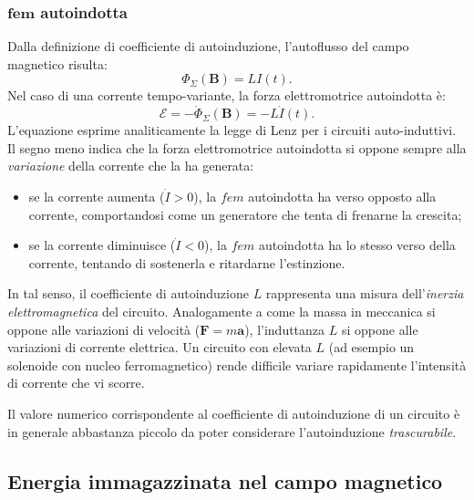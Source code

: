 \documentclass[a4paper,11pt]{report}
\begin{document}
\subsubsection{$\bm{fem}$ autoindotta}
Dalla definizione di coefficiente di autoinduzione, l'autoflusso del campo magnetico risulta:
\begin{equation}
\Phi_\Sigma(\bm{B}) = LI(t).
\end{equation}
Nel caso di una corrente tempo-variante, la forza elettromotrice autoindotta è:
\begin{equation}
\mathcal{E} = -\dot{\Phi}_\Sigma(\bm{B}) = -L\dot{I}(t).
\end{equation}
L'equazione esprime analiticamente la legge di Lenz per i circuiti auto-induttivi. Il segno meno indica che la forza elettromotrice autoindotta si oppone sempre alla \textit{variazione} della corrente che la ha generata:
\begin{itemize}
    \item se la corrente aumenta ($\dot{I} > 0$), la $fem$ autoindotta ha verso opposto alla corrente, comportandosi come un generatore che tenta di frenarne la crescita;
    \item se la corrente diminuisce ($\dot{I} < 0$), la $fem$ autoindotta ha lo stesso verso della corrente, tentando di sostenerla e ritardarne l'estinzione.
\end{itemize}
In tal senso, il coefficiente di autoinduzione $L$ rappresenta una misura dell'\textit{inerzia elettromagnetica} del circuito. Analogamente a come la massa in meccanica si oppone alle variazioni di velocità ($\bm{F} = m\bm{a}$), l'induttanza $L$ si oppone alle variazioni di corrente elettrica. Un circuito con elevata $L$ (ad esempio un solenoide con nucleo ferromagnetico) rende difficile variare rapidamente l'intensità di corrente che vi scorre.

\noindent
Il valore numerico corrispondente al coefficiente di autoinduzione di un circuito è in generale abbastanza piccolo da poter considerare l'autoinduzione \textit{trascurabile}.


\subsection{Energia immagazzinata nel campo magnetico}
\end{document}
